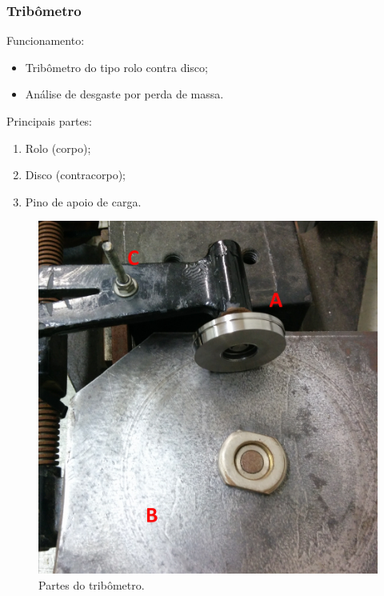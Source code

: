 \documentclass{beamer}
\begin{document}
\begin{frame}
	\frametitle{Tribômetro}

	\begin{minipage}[t]{0.45\textwidth}	
		Funcionamento:
		\begin{itemize}
			\item Tribômetro do tipo rolo contra disco;
			\item Análise de desgaste por perda de massa.
		\end{itemize}
		
		Principais partes:
		\begin{enumerate}
		\item Rolo (corpo);
		\item Disco (contracorpo);
		\item Pino de apoio de carga.
		\end{enumerate}
	\end{minipage}
	\hfill
	\begin{minipage}[t]{0.45\textwidth}
		\begin{figure}
			\centering
			\includegraphics[width=1\textwidth]{tribometro_partes}
			\caption{Partes do tribômetro.}
			\label{fig:tribometro_partes}
		\end{figure}
	\end{minipage}

\end{frame}
\end{document}
